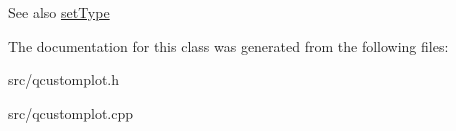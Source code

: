 \begin{DoxySeeAlso}{See also}
\hyperlink{classQCPItemPosition_aa476abf71ed8fa4c537457ebb1a754ad}{set\+Type} 
\end{DoxySeeAlso}


The documentation for this class was generated from the following files\+:\begin{DoxyCompactItemize}
\item 
src/qcustomplot.\+h\item 
src/qcustomplot.\+cpp\end{DoxyCompactItemize}

